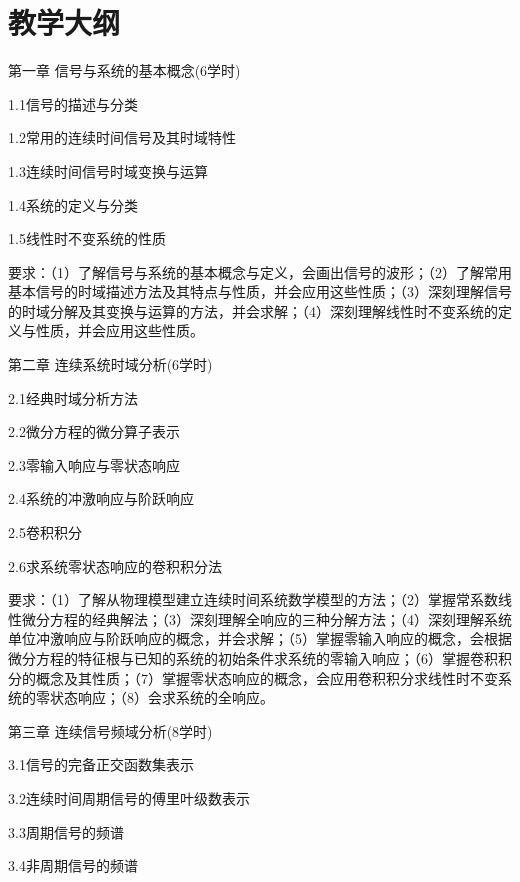 \documentclass[letterpaper]{article}
\begin{document}
\section*{\textsc{教学大纲}}
第一章 \quad 信号与系统的基本概念(6学时)\par
\quad\quad 1.1信号的描述与分类\par
\quad\quad 1.2常用的连续时间信号及其时域特性\par
\quad\quad 1.3连续时间信号时域变换与运算\par
\quad\quad 1.4系统的定义与分类\par
\quad\quad 1.5线性时不变系统的性质\par
\quad\quad 要求：（1）了解信号与系统的基本概念与定义，会画出信号的波形；（2）了解常用基本信号的时域描述方法及其特点与性质，并会应用这些性质；（3）深刻理解信号的时域分解及其变换与运算的方法，并会求解；（4）深刻理解线性时不变系统的定义与性质，并会应用这些性质。\par
\vspace{1em}
第二章 \quad 连续系统时域分析(6学时)\par
\quad\quad 2.1经典时域分析方法\par
\quad\quad 2.2微分方程的微分算子表示\par
\quad\quad 2.3零输入响应与零状态响应\par
\quad\quad 2.4系统的冲激响应与阶跃响应\par
\quad\quad 2.5卷积积分\par
\quad\quad 2.6求系统零状态响应的卷积积分法\par
\quad\quad 要求：（1）了解从物理模型建立连续时间系统数学模型的方法；（2）掌握常系数线性微分方程的经典解法；（3）深刻理解全响应的三种分解方法；（4）深刻理解系统单位冲激响应与阶跃响应的概念，并会求解；（5）掌握零输入响应的概念，会根据微分方程的特征根与已知的系统的初始条件求系统的零输入响应；（6）掌握卷积积分的概念及其性质；（7）掌握零状态响应的概念，会应用卷积积分求线性时不变系统的零状态响应；（8）会求系统的全响应。\par
\vspace{1em}
第三章 \quad 连续信号频域分析(8学时)\par
\quad\quad 3.1信号的完备正交函数集表示\par
\quad\quad 3.2连续时间周期信号的傅里叶级数表示\par
\quad\quad 3.3周期信号的频谱\par
\quad\quad 3.4非周期信号的频谱\par
\end{document}
